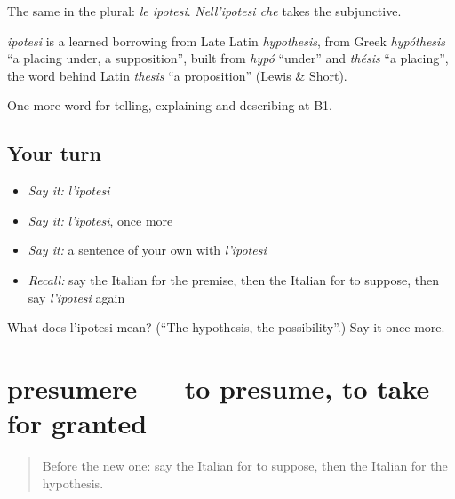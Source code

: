 The same in the plural: \emph{le ipotesi}. \emph{Nell'ipotesi che} takes the subjunctive.

\begin{cousinweb}
\emph{ipotesi} is a learned borrowing from Late Latin \emph{hypothesis}, from Greek \emph{hypóthesis} \textquotedblleft{}a placing under, a supposition\textquotedblright{}, built from \emph{hypó} \textquotedblleft{}under\textquotedblright{} and \emph{thésis} \textquotedblleft{}a placing\textquotedblright{}, the word behind Latin \emph{thesis} \textquotedblleft{}a proposition\textquotedblright{} (Lewis \& Short).
\end{cousinweb}

\begin{grammarlens}[title={What you've built}]
One more word for telling, explaining and describing at B1.
\end{grammarlens}

\subsection*{Your turn}
\begin{itemize}
\raggedright
  \item \emph{Say it:} \emph{l'ipotesi}
  \item \emph{Say it:} \emph{l'ipotesi}, once more
  \item \emph{Say it:} a sentence of your own with \emph{l'ipotesi}
  \item \emph{Recall:} say the Italian for the premise, then the Italian for to suppose, then say \emph{l'ipotesi} again
\end{itemize}

\begin{tcolorbox}[breakable,colback=teal!4,colframe=teal!35!black,title={Before you move on}]
What does l'ipotesi mean? (\textquotedblleft{}The hypothesis, the possibility\textquotedblright{}.) Say it once more.
\end{tcolorbox}
\section[presumere]{presumere — to presume, to take for granted}

\label{lesson:IT-C372-presumere}



\begin{quote}
Before the new one: say the Italian for to suppose, then the Italian for the hypothesis.
\end{quote}

